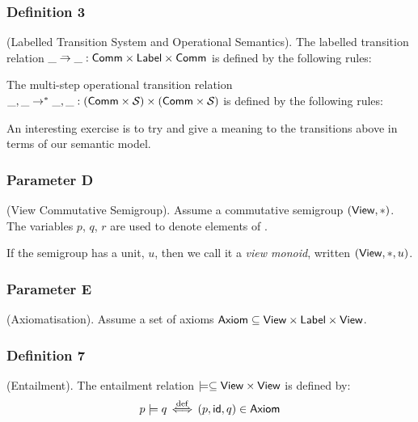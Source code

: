 \subsubsection{Definition 3}
(Labelled Transition System and Operational Semantics).
The labelled transition relation
$\_ \stackrel{\_}{\rightarrow} \_ : \mathsf{Comm} \times \mathsf{Label} \times \mathsf{Comm}$
is defined by the following rules:
The multi-step operational transition relation
$\_,\_ \rightarrow^* \_,\_ : (\mathsf{Comm}\times\mathcal{S}_{\mathsf{}}) \times (\mathsf{Comm}\times\mathcal{S}_{\mathsf{}})$
is defined by the following rules:

An interesting exercise is to try and give a meaning
to the transitions above in terms of our semantic model.

\subsubsection{Parameter D} (View Commutative Semigroup).
Assume a commutative
semigroup $(\mathsf{View},*)$. The variables $p$, $q$, $r$ are used to denote
elements of \View.

If the semigroup has a unit, $u$, then we call it a \emph{view monoid},
written $(\mathsf{View},*,u)$.

\subsubsection{Parameter E} (Axiomatisation).
Assume a set of axioms $\mathsf{Axiom} \subseteq \mathsf{View} \times \mathsf{Label} \times \mathsf{View}$.

\subsubsection{Definition 7}
(Entailment).
The entailment relation
$\models \subseteq \mathsf{View} \times \mathsf{View}$
is defined by:
\[
  p\models q \mathrel{\stackrel{\mathrm{def}}{\,\Leftarrow\!\Rightarrow\,}} (p,\mathsf{id},q) \in \mathsf{Axiom}
\]

